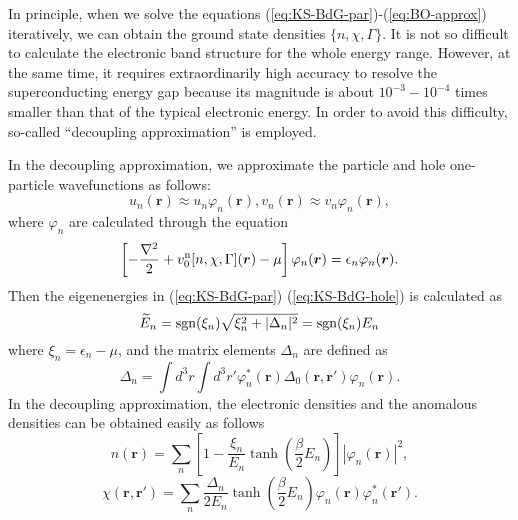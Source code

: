 In principle, when we solve the equations (\ref{eq:KS-BdG-par})-(\ref{eq:BO-approx}) iteratively, 
we can obtain the ground state densities $\{n, \chi, \Gamma\}$.
It is not so difficult to calculate the electronic band structure for the whole energy range.
However, at the same time, it requires extraordinarily high accuracy to resolve the superconducting energy gap
because its magnitude is about $10^{-3} - 10^{-4}$ times smaller than that of the typical electronic energy.
In order to avoid this difficulty, so-called ``decoupling approximation''\cite{Gross1991,KurthphD,LudersphD} is employed.

In the decoupling approximation, we approximate the particle and hole one-particle wavefunctions as follows:
%
\begin{equation}
	u_n(\bm{r}) \approx u_n\varphi_n(\bm{r}),   v_n(\bm{r}) \approx v_n\varphi_n(\bm{r}), 
	\label{eq:approx-wfc}
\end{equation}
%
where $\varphi_n$ are calculated through the equation
\begin{equation}
	\left[ -\frac{\nabla^2}{2} + v^{\rm n}_0[n, \chi, \Gamma](\bm{r}) - \mu \right]
	\varphi_n(\bm{r}) = \epsilon_n\varphi_n(\bm{r}).
	\label{eq:KS-eq}
\end{equation}
%
Then the eigenenergies in (\ref{eq:KS-BdG-par}) (\ref{eq:KS-BdG-hole}) is calculated as
%
\begin{equation}
	\widetilde{E}_n = {\rm sgn}(\xi_n)\sqrt{\xi^2_n + |\Delta_n|^2}
	                = {\rm sgn}(\xi_n) E_n
			\label{eq:KS-energy}
\end{equation}
%
where $\xi_n = \epsilon_n - \mu$, and the matrix elements $\Delta_n$ are defined as
%
\begin{equation}
	\Delta_n = \int d^3r\int d^3r' \varphi^{\ast}_n(\bm{r})\Delta_0(\bm{r}, \bm{r'})\varphi_n(\bm{r}).
	\label{eq:Deltan}
\end{equation}
%
In the decoupling approximation, the electronic densities and the anomalous densities 
can be obtained easily as follows
%
\begin{equation}
	n(\bm{r}) = \sum_{n} \left[1-\frac{\xi_n}{E_n}\tanh \left(\frac{\beta}{2}E_n \right) \right]
	                     |\varphi_n(\bm{r})|^2,
	\label{eq:el-density}
\end{equation}
%
\begin{equation}
	\chi(\bm{r}, \bm{r'}) = \sum_{n}\frac{\Delta_n}{2E_n}\tanh \left(\frac{\beta}{2}E_n \right)
	\varphi_n(\bm{r})\varphi^{\ast}_n(\bm{r'}).
	\label{eq:anom-density}
\end{equation}
%

